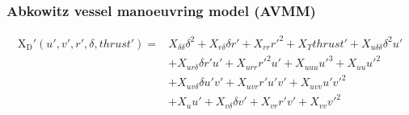 \subsubsection*{\normalfont \textbf{Abkowitz vessel manoeuvring model (AVMM) \cite{abkowitz_ship_1964}}}
\begin{equation}\label{equation:02.01_manoeuvring models:eqxabkowitz}
\begin{split}
\operatorname{X_{D}'}{\left(u',v',r',\delta,thrust' \right)} = & X_{\delta\delta} \delta^{2} + X_{r\delta} \delta r' + X_{rr} r'^{2} + X_{T} thrust' + X_{u\delta\delta} \delta^{2} u' \\ 
& + X_{ur\delta} \delta r' u' + X_{urr} r'^{2} u' + X_{uuu} u'^{3} + X_{uu} u'^{2} \\ 
& + X_{uv\delta} \delta u' v' + X_{uvr} r' u' v' + X_{uvv} u' v'^{2} \\
& + X_{u} u' + X_{v\delta} \delta v' + X_{vr} r' v' + X_{vv} v'^{2} 
\end{split}
\end{equation}

